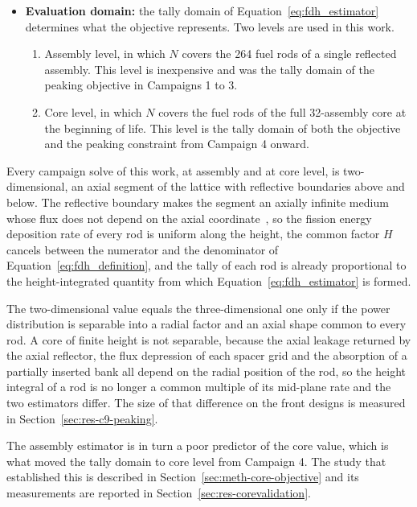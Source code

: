 \begin{itemize}
  \item \textbf{Evaluation domain:} the tally domain of
        Equation~\eqref{eq:fdh_estimator} determines what the objective
        represents. Two levels are used in this work.

\begin{enumerate}
  \item Assembly level, in which $N$ covers the 264 fuel rods of a
        single reflected assembly. This level is inexpensive and was the
        tally domain of the peaking objective in Campaigns 1 to 3.

  \item Core level, in which $N$ covers the fuel rods of the full
        32-assembly core at the beginning of life. This level is the tally
        domain of both the objective and the peaking constraint from
        Campaign 4 onward.
\end{enumerate}
\end{itemize}

Every campaign solve of this work, at assembly and at core level, is
two-dimensional, an axial segment of the lattice with reflective
boundaries above and below. The reflective boundary makes the segment an
axially infinite medium whose flux does not depend on the axial
coordinate~\cite{openmc_docs,duderstadt_hamilton_1976}, so the fission
energy deposition rate of every rod is uniform along the height, the
common factor $H$ cancels between the numerator and the denominator of
Equation~\eqref{eq:fdh_definition}, and the tally of each rod is already
proportional to the height-integrated quantity from which
Equation~\eqref{eq:fdh_estimator} is formed.

The two-dimensional value equals the three-dimensional one only if the
power distribution is separable into a radial factor and an axial shape
common to every rod. A core of finite height is not separable, because
the axial leakage returned by the axial reflector, the flux depression
of each spacer grid and the absorption of a partially inserted bank all
depend on the radial position of the rod, so the height integral of a
rod is no longer a common multiple of its mid-plane rate and the two
estimators differ. The size of that difference on the front designs is
measured in Section~\ref{sec:res-c9-peaking}.

The assembly estimator is in turn a poor predictor of the core value,
which is what moved the tally domain to core level from Campaign 4. The
study that established this is described in
Section~\ref{sec:meth-core-objective} and its measurements are reported
in Section~\ref{sec:res-corevalidation}.

